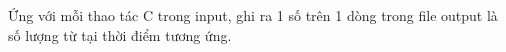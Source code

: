 Ứng với mỗi thao tác C trong input, ghi ra 1 số trên 1 dòng trong file output là số lượng từ tại thời điểm tương ứng.